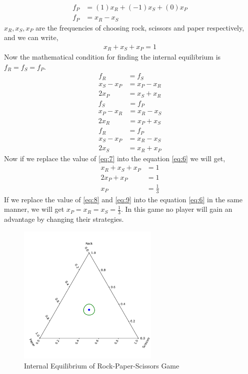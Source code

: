 \documentclass{article}
\begin{document}
\begin{align}
f_P &= (1)x_R + (-1)x_S + (0)x_P \nonumber\\
f_P &= x_R - x_S \nonumber
\end{align}
$x_R,x_S,x_P$ are the frequencies of choosing rock, scissors and paper respectively, and we can write,
\begin{align}
x_R+x_S+x_P=1 \label{eq:8}
\end{align}
Now the mathematical condition for finding the internal equilibrium is $f_R=f_S=f_P$.
\begin{align}
f_R &=f_S \nonumber\\
x_S-x_P &=x_P-x_R \nonumber\\
2x_P &=x_S+x_R \label{eq:9}
\end{align}
\begin{align}
f_S &=f_P \nonumber\\
x_P-x_R &=x_R-x_S \nonumber\\
2x_R &=x_P+x_S \label{eq:10}
\end{align}
\begin{align}
f_R&=f_P \nonumber\\
x_S-x_P&=x_R-x_S \nonumber\\
2x_S&=x_R+x_P \label{eq:11}
\end{align}
Now if we replace the value of \eqref{eq:7} into the equation \eqref{eq:6} we will get,
\begin{align}
x_R+x_S+x_P&=1\nonumber\\
2x_P+x_P&=1\nonumber\\
x_P&=\frac{1}{3}\nonumber
\end{align}
If we replace the value of \eqref{eq:8} and \eqref{eq:9} into the equation \eqref{eq:6} in the same manner, we will get $x_P=x_R=x_S=\frac{1}{3}$. In this game no player will gain an advantage by changing their strategies.
\begin{figure}[H]
    \centering
    \includegraphics[width=0.6\textwidth]{RPS.pdf}
    \caption{Internal Equilibrium of Rock-Paper-Scissors Game}
    \label{fig:4}
\end{figure} 
\end{document}
